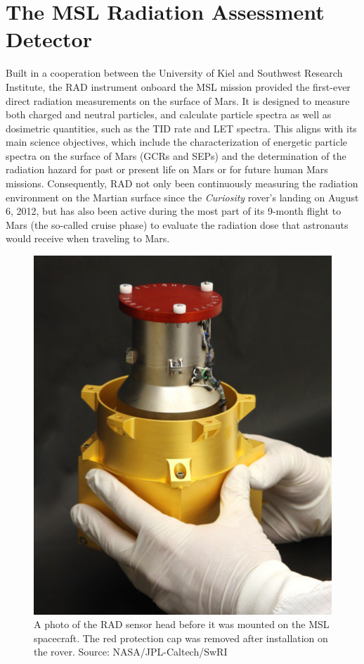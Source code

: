 \section{The MSL Radiation Assessment Detector}
\label{sec:mslrad}

Built in a cooperation between the University of Kiel and Southwest Research Institute, the \acl{RAD} \citep[\acs{RAD},][]{Hassler-2012-MSLRAD} instrument onboard the \acl{MSL} \citep[\acs{MSL},][]{Grotzinger-2012} mission provided the first-ever direct radiation measurements on the surface of Mars. It is designed to measure both charged and neutral particles, and calculate particle spectra as well as dosimetric quantities, such as the \ac{TID} rate and \ac{LET} spectra. This aligns with its main science objectives, which include the characterization of energetic particle spectra on the surface of Mars (\acp{GCR} and \acp{SEP}) and the determination of the radiation hazard for past or present life on Mars or for future human Mars missions. Consequently, \ac{RAD} not only been continuously measuring the radiation environment on the Martian surface since the \textit{Curiosity} rover's landing on August 6, 2012, but has also been active during the most part of its 9-month flight to Mars (the so-called cruise phase) to evaluate the radiation dose that astronauts would receive when traveling to Mars.

\begin{figure}
	\centering
	\includegraphics[width=0.4\linewidth]{images/rad}
	\caption[Photo of the \acs{RAD} sensor head]{A photo of the \ac{RAD} sensor head before it was mounted on the \ac{MSL} spacecraft. The red protection cap was removed after installation on the rover. Source: NASA/JPL-Caltech/SwRI}
	\label{fig:rad-photo}
\end{figure}


